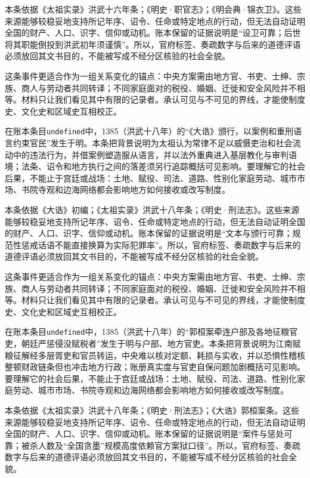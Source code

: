 本条依据《太祖实录》洪武十六年条；《明史·职官志》；《明会典·锦衣卫》。这些来源能够较稳妥地支持所记年序、诏令、任命或特定地点的行动，但无法自动证明全国的财产、人口、识字、信仰或动机。账本保留的证据说明是“设卫可靠；后世将其职能倒投到洪武初年须谨慎”。所以，官府标签、奏疏数字与后来的道德评语必须放回其文书目的，不能被写成不经分区核验的社会全貌。

这条事件更适合作为一组关系变化的锚点：中央方案需由地方官、书吏、士绅、宗族、商人与劳动者共同转译；不同家庭面对的税役、婚姻、迁徙和安全风险并不相等。材料只让我们看见其中有限的记录者。承认可见与不可见的界线，才能使制度史、文化史和区域史互相校正。

在账本条目\texttt{undefined}中，1385（洪武十八年）的“《大诰》颁行，以案例和重刑语言约束官民”发生于明。本条把背景说明为太祖认为常律不足以威慑吏治和社会流动中的违法行为，并借案例塑造服从语言，并以法外重典进入基层教化与审判语境；法条、诏令和地方执行之间的落差须另行追踪概括可见影响。要理解它的社会后果，不能止于宫廷或战场：土地、赋役、司法、道路、性别化家庭劳动、城市市场、书院寺观和边海网络都会影响地方如何接收或改写制度。

本条依据《大诰》初编；《太祖实录》洪武十八年条；《明史·刑法志》。这些来源能够较稳妥地支持所记年序、诏令、任命或特定地点的行动，但无法自动证明全国的财产、人口、识字、信仰或动机。账本保留的证据说明是“文本与颁行可靠；规范性惩戒话语不能直接换算为实际犯罪率”。所以，官府标签、奏疏数字与后来的道德评语必须放回其文书目的，不能被写成不经分区核验的社会全貌。

这条事件更适合作为一组关系变化的锚点：中央方案需由地方官、书吏、士绅、宗族、商人与劳动者共同转译；不同家庭面对的税役、婚姻、迁徙和安全风险并不相等。材料只让我们看见其中有限的记录者。承认可见与不可见的界线，才能使制度史、文化史和区域史互相校正。

在账本条目\texttt{undefined}中，1385（洪武十八年）的“郭桓案牵连户部及各地征粮官吏，朝廷严惩侵没赋税者”发生于明与户部、地方官吏。本条把背景说明为江南赋粮征解经多层胥吏和官员转运，中央难以核对定额、耗损与实收，并以恐惧性稽核整顿财政链条但也冲击地方行政；账册真实度与官吏自保问题加剧概括可见影响。要理解它的社会后果，不能止于宫廷或战场：土地、赋役、司法、道路、性别化家庭劳动、城市市场、书院寺观和边海网络都会影响地方如何接收或改写制度。

本条依据《太祖实录》洪武十八年条；《明史·刑法志》；《大诰》郭桓案条。这些来源能够较稳妥地支持所记年序、诏令、任命或特定地点的行动，但无法自动证明全国的财产、人口、识字、信仰或动机。账本保留的证据说明是“案件与惩处可靠；被杀人数及“全国贪墨”规模高度依赖官方案狱口径”。所以，官府标签、奏疏数字与后来的道德评语必须放回其文书目的，不能被写成不经分区核验的社会全貌。

